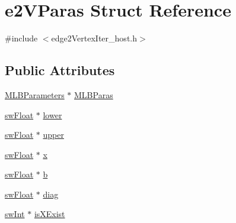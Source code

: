 \hypertarget{structe2VParas}{
\section{e2VParas Struct Reference}
\label{structe2VParas}
}


{\ttfamily \#include $<$edge2VertexIter\_\-host.h$>$}\subsection*{Public Attributes}
\begin{DoxyCompactItemize}
\item 
\hyperlink{structMLBParameters}{MLBParameters} $\ast$ \hyperlink{structe2VParas_adbc014a3c6f625888247c1c8f2d13ecc}{MLBParas}
\item 
\hyperlink{swMacro_8h_a4ce60b1aa82e56b7372553a6a5bf2c0b}{swFloat} $\ast$ \hyperlink{structe2VParas_a6036626301d5765def554aadddea0ae3}{lower}
\item 
\hyperlink{swMacro_8h_a4ce60b1aa82e56b7372553a6a5bf2c0b}{swFloat} $\ast$ \hyperlink{structe2VParas_aa47e1f24e424418952a31e4d943b961e}{upper}
\item 
\hyperlink{swMacro_8h_a4ce60b1aa82e56b7372553a6a5bf2c0b}{swFloat} $\ast$ \hyperlink{structe2VParas_a5d3d9444ff7cd409f4c555110ce4d892}{x}
\item 
\hyperlink{swMacro_8h_a4ce60b1aa82e56b7372553a6a5bf2c0b}{swFloat} $\ast$ \hyperlink{structe2VParas_a80d7971b5061c83b0983f41cbcb9a6e6}{b}
\item 
\hyperlink{swMacro_8h_a4ce60b1aa82e56b7372553a6a5bf2c0b}{swFloat} $\ast$ \hyperlink{structe2VParas_a6cac10a1d4542aba72bfd8995d59deae}{diag}
\item 
\hyperlink{swMacro_8h_a113cf5f6b5377cdf3fac6aa4e443e9aa}{swInt} $\ast$ \hyperlink{structe2VParas_a0aa09b653e20487edafa66bdf118ae48}{isXExist}
\end{DoxyCompactItemize}


